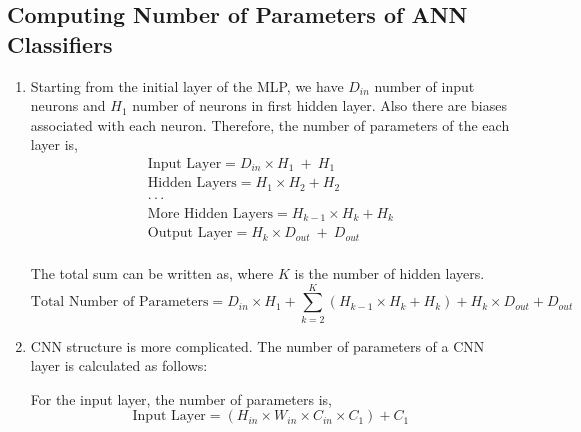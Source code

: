 \documentclass[3p,times,procedia]{elsarticle}
\begin{document}
\subsection{\textbf{Computing Number of Parameters of ANN Classifiers}}
\begin{enumerate}
    \item Starting from the initial layer of the MLP, we have $D_{in}$ number of input neurons and $H_1$ number of neurons in first hidden layer. Also there are biases associated with 
each neuron. Therefore, the number of parameters of the each layer is,
    \vspace{-0.5cm}
    \begin{equation*}
    \begin{array}{r}
    \textrm{Input Layer} = D_{in} \times H_{1} \ +\ H_{1} \\
    \textrm{Hidden Layers}= H_1 \times H_2 + H_2\\
    \cdot \cdot \cdot \hspace{2em} \\
    \textrm{More Hidden Layers} = H_{k-1} \times H_k + H_k\\
    \textrm{Output Layer} = H_{k} \times D_{out} \ +\ D_{out} \\
    \end{array}
    \end{equation*}

    \vspace{-0.25cm}
    The total sum can be written as, where $K$ is the number of hidden layers.
    \vspace{-0.5cm}
    \begin{equation*}
        \textrm{Total Number of Parameters} = D_{in}\times H_1 + \sum_{k=2}^{K} (H_{k-1} \times H_k + H_k) + H_k \times D_{out} +  D_{out}
    \end{equation*}
    \vspace{-0.25cm}

    \item CNN structure is more complicated. The number of parameters of a CNN layer is calculated as follows:
    
    For the input layer, the number of parameters is,
    \vspace{-0.5cm}
    \begin{equation*}
        \textrm{Input Layer} = (H_{in} \times W_{in} \times C_{in} \times C_1 )+ C_1
    \end{equation*}


\end{enumerate}
\end{document}
